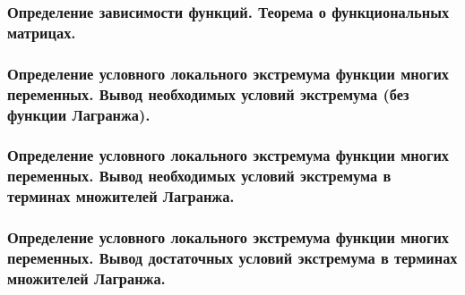 \documentclass[10pt]{article}
\begin{document}
    \subsubsection{Определение зависимости функций. Теорема о функциональных матрицах.}
    \subsubsection{Определение условного локального экстремума функции многих переменных. Вывод необходимых условий экстремума (без функции Лагранжа).}
    \subsubsection{Определение условного локального экстремума функции многих переменных. Вывод необходимых условий экстремума в терминах множителей Лагранжа.}
    \subsubsection{Определение условного локального экстремума функции многих переменных. Вывод достаточных условий экстремума в терминах множителей Лагранжа.}
\end{document}
